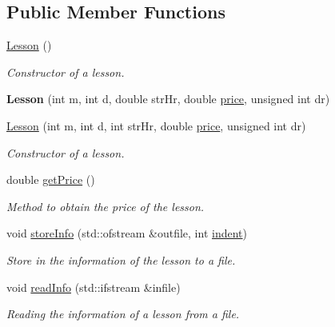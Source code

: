 \subsection*{Public Member Functions}
\begin{DoxyCompactItemize}
\item 
\mbox{\label{class_lesson_a1f6ed0da97171480b7d6d5696d6f2afc}} 
\mbox{\hyperlink{class_lesson_a1f6ed0da97171480b7d6d5696d6f2afc}{Lesson}} ()
\begin{DoxyCompactList}\small\item\em Constructor of a lesson. \end{DoxyCompactList}\item 
\mbox{\label{class_lesson_a2f2402e828e9ebdd7c90e712dc1164bd}} 
{\bfseries Lesson} (int m, int d, double str\+Hr, double \mbox{\hyperlink{class_reservation_a82e197bd30e7949ee9b8616ee4eacf83}{price}}, unsigned int dr)
\item 
\mbox{\hyperlink{class_lesson_a2d02413d32e4df560bcdb8cc9d00f7d7}{Lesson}} (int m, int d, int str\+Hr, double \mbox{\hyperlink{class_reservation_a82e197bd30e7949ee9b8616ee4eacf83}{price}}, unsigned int dr)
\begin{DoxyCompactList}\small\item\em Constructor of a lesson. \end{DoxyCompactList}\item 
double \mbox{\hyperlink{class_lesson_ad7a2f708f870040627a442cdf000683f}{get\+Price}} ()
\begin{DoxyCompactList}\small\item\em Method to obtain the price of the lesson. \end{DoxyCompactList}\item 
void \mbox{\hyperlink{class_lesson_a645855060ab3c915a6e0875bc5584887}{store\+Info}} (std\+::ofstream \&outfile, int \mbox{\hyperlink{class_reservation_a480981ed050bae19bc74bbb0bbb459f9}{indent}})
\begin{DoxyCompactList}\small\item\em Store in the information of the lesson to a file. \end{DoxyCompactList}\item 
void \mbox{\hyperlink{class_lesson_a3ac64e2f79bc9e381634d5d30499e8f1}{read\+Info}} (std\+::ifstream \&infile)
\begin{DoxyCompactList}\small\item\em Reading the information of a lesson from a file. \end{DoxyCompactList}\end{DoxyCompactItemize}
